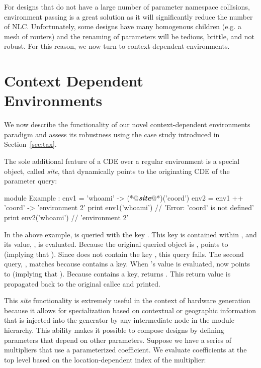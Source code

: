 For designs that do not have a large number of parameter namespace collisions, environment passing is a great solution as it will significantly reduce the number of NLC. 
Unfortunately, some designs have many homogenous children (e.g. a mesh of routers) and the renaming of parameters will be tedious, brittle, and not robust. 
For this reason, we now turn to context-dependent environments.

\section{Context Dependent\\
 Environments}
\label{sec:cde}

We now describe the functionality of our novel context-dependent environments paradigm and assess its robustness using the case study introduced in Section~\ref{sec:tax}.

The sole additional feature of a CDE over a regular environment is a special object, called \emph{site}, that dynamically points to the originating CDE of the parameter query:

\begin{phdl}
module Example :
  env1 = {'whoami' -> (*@\textcolor[rgb]{1,0.5,0}{\textbf{\textit{site}}}@*)('coord')}
  env2 = env1 ++ {'coord' -> 'environment 2'}
  print env1('whoami')     // 'Error: 'coord' is not defined'
  print env2('whoami')     // 'environment 2'
\end{phdl}

In the above example,  is queried with the key . 
This key is contained within , and its value, , is evaluated. 
Because the original queried object is ,  points to  (implying that ). 
Since  does not contain the key , this query fails.
The second query, , matches because  contains a  key. 
When 's value is evaluated,  now points to  (implying that ). 
Because  contains a  key,  returns . 
This return value is propagated back to the original  callee and printed.

This \emph{site} functionality is extremely useful in the context of hardware generation because it allows for specialization based on contextual or geographic information that is injected into the generator by any intermediate node in the module hierarchy.
This ability makes it possible to compose designs by defining parameters that depend on other parameters. Suppose we have a series of multipliers that use a parameterized coefficient. We evaluate coefficients at the top level based on the location-dependent index of the multiplier:

